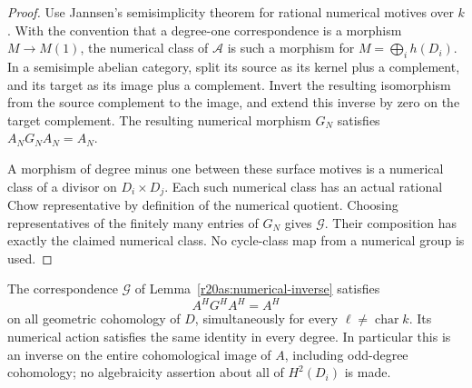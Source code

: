 \begin{proof}
Use Jannsen's semisimplicity theorem for rational numerical motives
over $k$ \cite[Theorem~1]{AS20Jannsen}.  With the convention that a
degree-one correspondence is a morphism $M\to M(1)$, the numerical
class of $\mathcal A$ is such a morphism for
$M=\bigoplus_i h(D_i)$.  In a semisimple abelian category, split its
source as its kernel plus a complement, and its target as its image
plus a complement.  Invert the resulting isomorphism from the source
complement to the image, and extend this inverse by zero on the target
complement.  The resulting numerical morphism $G_N$ satisfies
$A_NG_NA_N=A_N$.

A morphism of degree minus one between these surface motives is a
numerical class of a divisor on $D_i\times D_j$.  Each such numerical
class has an actual rational Chow representative by definition of
the numerical quotient.  Choosing representatives of the finitely
many entries of $G_N$ gives $\mathcal G$.  Their composition has
exactly the claimed numerical class.  No cycle-class map from a
numerical group is used.
\end{proof}

\begin{proposition}
\label{r20as:cohomological-inverse}
The correspondence $\mathcal G$ of
Lemma~\ref{r20as:numerical-inverse} satisfies
\[
                   A^H G^H A^H=A^H
 \tag{AS20.5}\label{r20as:full-inverse}
\]
on all geometric cohomology of $D$, simultaneously for every
$\ell\ne\operatorname{char}k$.  Its numerical action satisfies the
same identity in every degree.  In particular this is an inverse
on the entire cohomological image of $A$, including odd-degree
cohomology; no algebraicity assertion about all of $H^2(D_i)$ is
made.
\end{proposition}

